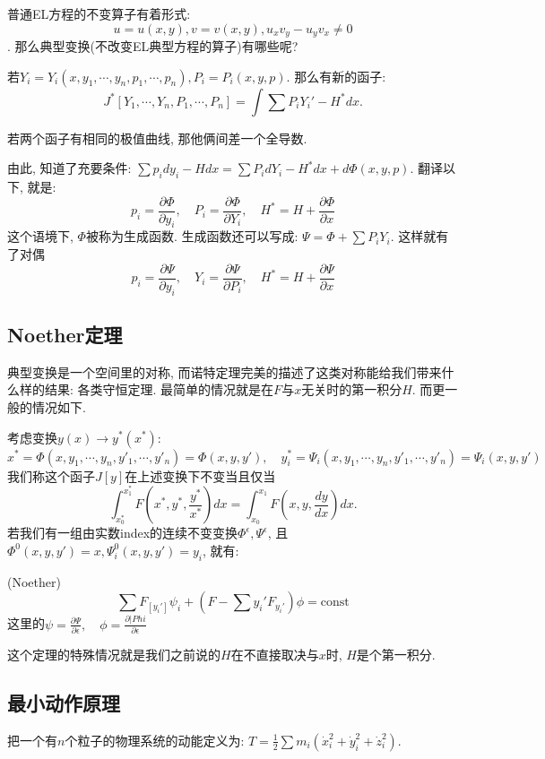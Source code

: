 普通EL方程的不变算子有着形式: 
\[u = u(x,y), v = v(x,y), u_xv_y - u_yv_x \ne 0\]. 
那么典型变换(不改变EL典型方程的算子)有哪些呢? 

若\(Y_i = Y_i(x,y_1,\cdots, y_n,p_1,\cdots, p_n), P_i = P_i(x,y,p)\). 
那么有新的函子: 
\[J^*[Y_1,\cdots, Y_n, P_1,\cdots,P_n] = \int \sum P_iY_i' - H^* dx. \]
\begin{lem}
    若两个函子有相同的极值曲线, 那他俩间差一个全导数. 
\end{lem}
由此, 知道了充要条件: \(\sum p_idy_i - H dx = \sum P_idY_i - H^*dx + d\Phi(x,y,p)\). 
翻译以下, 就是: 
\[p_i = \frac{\partial \Phi}{\partial y_i},\quad P_i = \frac{{\partial \Phi}}{\partial Y_i},\quad H^* = H + \frac{\partial \Phi}{\partial x}\]
这个语境下, \(\Phi\)被称为生成函数. 生成函数还可以写成: \(\Psi = \Phi + \sum P_iY_i\).
这样就有了对偶
\[p_i = \frac{\partial \Psi}{\partial y_i},\quad Y_i = \frac{\partial \Psi}{\partial P_i},\quad H^* = H + \frac{\partial \Psi}{\partial x}\]

\subsection{Noether定理}

典型变换是一个空间里的对称, 而诺特定理完美的描述了这类对称能给我们带来什么样的结果: 各类守恒定理. 
最简单的情况就是在\(F\)与\(x\)无关时的第一积分\(H\). 而更一般的情况如下. 

考虑变换\(y(x)\to y^*(x^*)\): 
\[x^* = \Phi(x,y_1,\cdots,y_n,y'_1,\cdots,y'_n) = \Phi(x,y,y'),\quad y_i^* = \Psi_i(x,y_1,\cdots,y_n,y'_1,\cdots,y'_n) = \Psi_i(x,y,y')\]
我们称这个函子\(J[y]\)在上述变换下不变当且仅当
\[\int_{x_0^*}^{x_1^*}F(x^*,y^*,\frac{y^*}{x^*}) dx = \int_{x_0}^{x_1} F(x,y,\frac{dy}{dx})dx.\]
 若我们有一组由实数index的连续不变变换\(\Phi^\epsilon, \Psi^\epsilon\),
 且\(\Phi^0(x,y,y') = x, \Psi_i^0(x,y,y') = y_i\), 就有:  
\begin{thm}(Noether)
    \[\sum F_[y_i']\psi_i + (F - \sum y_i'F_{y_i'})\phi = \text{const}\]
    这里的\(\psi = \frac{\partial \Psi}{\partial\epsilon}, \quad \phi = \frac{\partial |Phi}{\partial\epsilon}\)
\end{thm}

这个定理的特殊情况就是我们之前说的\(H\)在不直接取决与\(x\)时, \(H\)是个第一积分. 

\subsection{最小动作原理}

把一个有\(n\)个粒子的物理系统的动能定义为:
\(T = \frac{1}{2} \sum m_i(\dot x_i^2 + \dot y_i^2 + \dot z_i^2)\).

